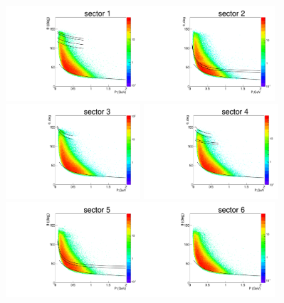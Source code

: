 \begin{figure}[htp]
\begin{center}
\begin{minipage}{.99\textwidth}
\begin{framed}
\includegraphics[width=5cm]{pictures/other_cuts/fiduch/th_vs_p_pim/pim_th_vs_p_sector1.pdf}\includegraphics[width=5cm]{pictures/other_cuts/fiduch/th_vs_p_pim/pim_th_vs_p_sector2.pdf}\includegraphics[width=5cm]{pictures/other_cuts/fiduch/th_vs_p_pim/pim_th_vs_p_sector3.pdf}
\includegraphics[width=5cm]{pictures/other_cuts/fiduch/th_vs_p_pim/pim_th_vs_p_sector4.pdf}\includegraphics[width=5cm]{pictures/other_cuts/fiduch/th_vs_p_pim/pim_th_vs_p_sector5.pdf}\includegraphics[width=5cm]{pictures/other_cuts/fiduch/th_vs_p_pim/pim_th_vs_p_sector6.pdf}

\end{framed}
\end{minipage}
\end{center}
\end{figure}
